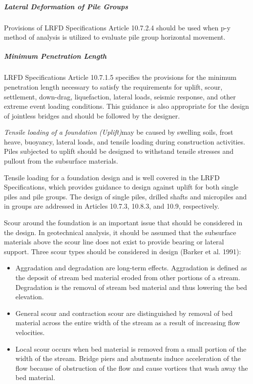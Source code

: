 \subparagraph{Lateral Deformation of Pile Groups}
Provisions of LRFD Specifications Article 10.7.2.4 should be used when p-y method of analysis is utilized to evaluate pile group horizontal movement.

\subparagraph{Minimum Penetration Length}
LRFD Specifications Article 10.7.1.5 specifies the provisions for the minimum penetration length necessary to satisfy the requirements for uplift, scour, settlement, down-drag, liquefaction, lateral loads, seismic response, and other extreme event loading conditions. This guidance is also appropriate for the design of jointless bridges and should be followed by the designer.

\emph{Tensile loading of a foundation (Uplift)}may be caused by swelling soils, frost heave, buoyancy, lateral loads,
and tensile loading during construction activities. Piles subjected to uplift should be designed to withstand tensile
stresses and pullout from the subsurface materials.

Tensile loading for a foundation design and is well covered in the LRFD Specifications, which provides guidance
to design against uplift for both single piles and pile groups. The design of single piles, drilled shafts and micropiles
and in groups are addressed in Articles 10.7.3, 10.8.3, and 10.9, respectively.

Scour around the foundation is an important issue that should be considered in the design. In geotechnical analysis, it should be assumed that the subsurface materials above the scour line does not exist to provide bearing or lateral support. Three scour types should be considered in design (Barker et al. 1991):
\begin{itemize}
  \item Aggradation and degradation are long-term effects. Aggradation is defined as the deposit of stream bed material eroded from other portions of a stream. Degradation is the removal of stream bed material and thus lowering the bed elevation.
  \item General scour and contraction scour are distinguished by removal of bed material across the entire width of the stream as a result of increasing flow velocities.
  \item Local scour occurs when bed material is removed from a small portion of the width of the stream. Bridge piers and abutments induce acceleration of the flow because of obstruction of the flow and cause vortices that
  wash away the bed material.
\end{itemize}

